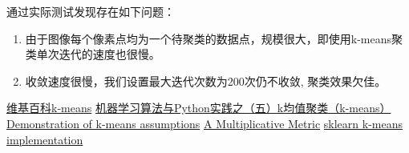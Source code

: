 \documentclass{ctexart}
\theoremstyle{definition}
\theoremstyle{remark}
\begin{document}
通过实际测试发现存在如下问题：
\begin{enumerate}
\item 由于图像每个像素点均为一个待聚类的数据点，规模很大，即使用k-means聚类单次迭代的速度也很慢。
\item 收敛速度很慢，我们设置最大迭代次数为200次仍不收敛, 聚类效果欠佳。
\end{enumerate}
\begin{thebibliography}{9}
 \href{https://en.wikipedia.org/wiki/k-means_clustering}{维基百科k-means}
 \href{https://blog.csdn.net/zouxy09/article/details/17589329}{机器学习算法与Python实践之（五）k均值聚类（k-means）}
 \href{http://scikit-learn.org/stable/auto_examples/cluster/plot_kmeans_assumptions.html#sphx-glr-auto-examples-cluster-plot-kmeans-assumptions-py}{Demonstration of k-means assumptions}
 \href{http://www.jstor.org/stable/2690124?seq=1#page_scan_tab_contents}{A Multiplicative Metric}
\href{https://github.com/scikit-learn/scikit-learn/blob/master/sklearn/cluster/k_means_.py}{sklearn k-means implementation}
\end{thebibliography}
\end{document}
